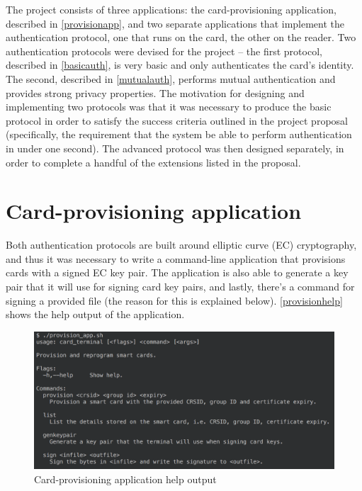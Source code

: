 \documentclass[12pt,a4paper,twoside,openright]{report}
\begin{document}
The project consists of three applications: the card-provisioning application, described in \autoref{provisionapp}, and two separate applications that implement the authentication protocol, one that runs on the card, the other on the reader. Two authentication protocols were devised for the project -- the first protocol, described in \autoref{basicauth}, is very basic and only authenticates the card's identity. The second, described in \autoref{mutualauth}, performs mutual authentication and provides strong privacy properties. The motivation for designing and implementing two protocols was that it was necessary to produce the basic protocol in order to satisfy the success criteria outlined in the project proposal (specifically, the requirement that the system be able to perform authentication in under one second). The advanced protocol was then designed separately, in order to complete a handful of the extensions listed in the proposal.

\section{Card-provisioning application}
\label{provisionapp}

Both authentication protocols are built around elliptic curve (EC) cryptography, and thus it was necessary to write a command-line application that provisions cards with a signed EC key pair. The application is also able to generate a key pair that it will use for signing card key pairs, and lastly, there's a command for signing a provided file (the reason for this is explained below). \autoref{provisionhelp} shows the help output of the application.

\begin{figure}[tbh]
\centerline{\includegraphics[scale=0.7]{figures/provisionhelp.png}}
\caption{Card-provisioning application help output}
\label{provisionhelp}
\end{figure}
\end{document}
